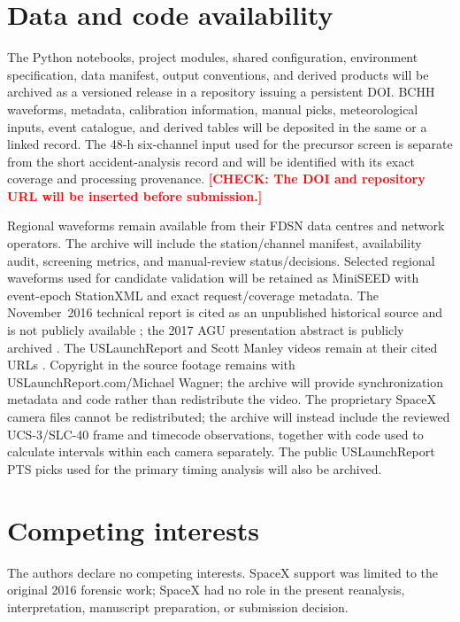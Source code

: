 \documentclass[]{seismica}
\newcommand{\checkme}[1]{\textcolor{red}{\textbf{[CHECK: #1]}}}
\begin{document}
\section*{Data and code availability}

The Python notebooks, project modules, shared configuration, environment
specification, data manifest, output conventions, and derived products will be
archived as a versioned release in a repository issuing a persistent DOI. BCHH
waveforms, metadata, calibration information, manual picks, meteorological
inputs, event catalogue, and derived tables will be deposited in the same or a
linked record. The 48-h six-channel input used for the precursor screen is
separate from the short accident-analysis record and will be identified with
its exact coverage and processing provenance. \checkme{The DOI and repository URL will be 
inserted before submission.}

Regional waveforms remain available from their FDSN data centres and network
operators. The archive will include the station/channel manifest, availability
audit, screening metrics, and manual-review status/decisions. Selected regional
waveforms used for candidate validation will be retained as MiniSEED with
event-epoch StationXML and exact request/coverage metadata. The November~2016
technical report is cited as an unpublished historical source and is not
publicly available \citep{thompson_mcnutt_fireball_2016}; the 2017 AGU
presentation abstract is publicly archived \citep{thompson_agu_falcon9_2017}. 
The USLaunchReport and Scott Manley videos remain at their cited URLs
\citep{uslaunchreport_amos6_video_2016,manley_spacex_explosion_2016}. Copyright
in the source footage remains with USLaunchReport.com/Michael Wagner; the
archive will provide synchronization metadata and code rather than redistribute
the video. The proprietary SpaceX camera files cannot be redistributed; the archive
will instead include the reviewed UCS-3/SLC-40 frame and timecode observations,
together with code used to calculate intervals within each camera separately.
The public USLaunchReport PTS picks used for the primary timing analysis will
also be archived.


\section*{Competing interests}

The authors declare no competing interests. SpaceX support was limited to the
original 2016 forensic work; SpaceX had no role in the present reanalysis,
interpretation, manuscript preparation, or submission decision.


\end{document}
